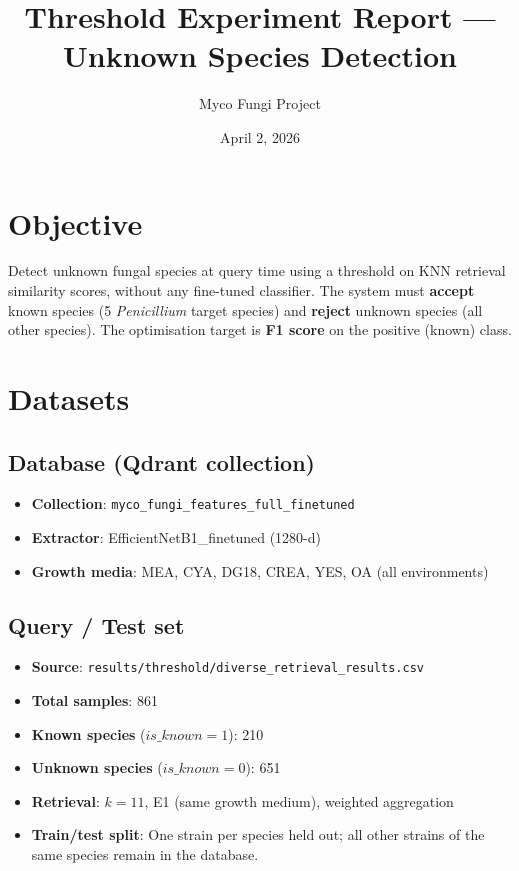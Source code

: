 \documentclass[11pt]{article}
\title{Threshold Experiment Report — Unknown Species Detection}
\author{Myco Fungi Project}
\date{April 2, 2026}
\begin{document}
\maketitle

\section{Objective}
Detect unknown fungal species at query time using a threshold on KNN retrieval
similarity scores, without any fine-tuned classifier.
The system must \textbf{accept} known species (5 \textit{Penicillium} target species)
and \textbf{reject} unknown species (all other species).
The optimisation target is \textbf{F1 score} on the positive (known) class.

\section{Datasets}
\subsection{Database (Qdrant collection)}
\begin{itemize}
  \item \textbf{Collection}: \texttt{myco\_fungi\_features\_full\_finetuned}
  \item \textbf{Extractor}: EfficientNetB1\_finetuned (1280-d)
  \item \textbf{Growth media}: MEA, CYA, DG18, CREA, YES, OA (all environments)
\end{itemize}

\subsection{Query / Test set}
\begin{itemize}
  \item \textbf{Source}: \texttt{results/threshold/diverse\_retrieval\_results.csv}
  \item \textbf{Total samples}: 861
  \item \textbf{Known species} ($is\_known=1$): 210
  \item \textbf{Unknown species} ($is\_known=0$): 651
  \item \textbf{Retrieval}: $k=11$, E1 (same growth medium), weighted aggregation
  \item \textbf{Train/test split}: One strain per species held out; all other strains
        of the same species remain in the database.
\end{itemize}
\end{document}
